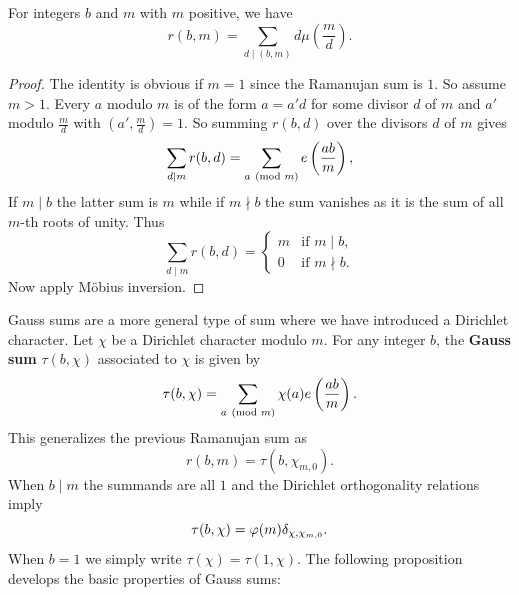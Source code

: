     \begin{proposition}\label{prop:Ramanujan_sum_evaluation}
      For integers \(b\) and \(m\) with \(m\) positive, we have
      \[
        r(b,m) = \sum_{d \mid (b,m)}d\mu\left(\frac{m}{d}\right).
      \]
    \end{proposition}
    \begin{proof}
      The identity is obvious if \(m = 1\) since the Ramanujan sum is \(1\). So assume \(m > 1\). Every \(a\) modulo \(m\) is of the form \(a = a'd\) for some divisor \(d\) of \(m\) and \(a'\) modulo \(\frac{m}{d}\) with \(\left(a',\frac{m}{d}\right) = 1\). So summing \(r(b,d)\) over the divisors \(d\) of \(m\) gives
      \[
        \sum_{d \mid m}r(b,d) = \sum_{a \ (\mathrm{mod}\text{ }m)}e\left(\frac{ab}{m}\right),
      \]
      If \(m \mid b\) the latter sum is \(m\) while if \(m \nmid b\) the sum vanishes as it is the sum of all \(m\)-th roots of unity. Thus
      \[
        \sum_{d \mid m}r(b,d) = \begin{cases} m & \text{if \(m \mid b\)}, \\ 0 & \text{if \(m \nmid b\)}. \end{cases}
      \]
      Now apply M\"obius inversion.
    \end{proof}

    Gauss sums are a more general type of sum where we have introduced a Dirichlet character. Let \(\chi\) be a Dirichlet character modulo \(m\). For any integer \(b\), the \textbf{Gauss sum} \(\tau(b,\chi)\) associated to \(\chi\) is given by
    \[
      \tau(b,\chi) = \sum_{a \ (\mathrm{mod}\text{ }m)}\chi(a)e\left(\frac{ab}{m}\right).
    \]
    This generalizes the previous Ramanujan sum as
    \[
      r(b,m) = \tau(b,\chi_{m,0}).
    \]
    When \(b \mid m\) the summands are all \(1\) and the Dirichlet orthogonality relations imply
    \[
      \tau(b,\chi) = \varphi(m)\delta_{\chi,\chi_{m,0}}.
    \]
    When \(b = 1\) we simply write \(\tau(\chi) = \tau(1,\chi)\). The following proposition develops the basic properties of Gauss sums:

